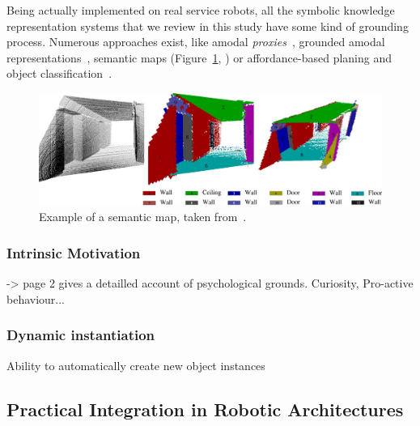 \documentclass[a4paper, twocolumn]{article}
\begin{document}
Being actually implemented on real service robots, all the symbolic knowledge
representation systems that we review in this study have some kind of grounding
process. Numerous approaches exist, like amodal
\emph{proxies}~\cite{Jacobsson2008}, grounded amodal
representations~\cite{Alami2011, Mavridis2006}, semantic maps
(Figure~\ref{fig|semanticmap}, \cite{Nuechter2008, Galindo2008,Blodow2011}) or
affordance-based planing and object classification~\cite{Lorken2008,
Varadarajan2011}.

\begin{figure}
    \centering
    \includegraphics[width=0.9\columnwidth]{semanticmaps_hertzberg.png}
    \caption{Example of a semantic map, taken from~\cite{Nuechter2008}.}
    \label{fig|semanticmap}
\end{figure}

\subsubsection{Intrinsic Motivation}

\cite{Oudeyer2007} -> page 2 gives a detailled account of psychological grounds.
Curiosity, Pro-active behaviour...

\subsubsection{Dynamic instantiation}
\label{sect|new-instances}
Ability to automatically create new object instances

\subsection{Practical Integration in Robotic Architectures}
\label{sect|integration-robot}

\begin{scriptsize}
\begin{center}
\end{center}
\end{scriptsize}
\end{document}
